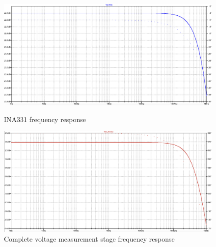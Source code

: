 \begin{figure}[H]
    \centering
    \begin{minipage}{0.48\textwidth}
        \centering
        \includegraphics[width=\textwidth]{INA331FreqResponse.png}
        \caption{INA331 frequency response}
        \label{fig:ina_freq}
    \end{minipage}\hfill
    \begin{minipage}{0.48\textwidth}
        \centering
        \includegraphics[width=\textwidth]{VmeasFreqResponse.png}
        \caption{Complete voltage measurement stage frequency response}
        \label{fig:v_meas_freq}
    \end{minipage}
\end{figure}

